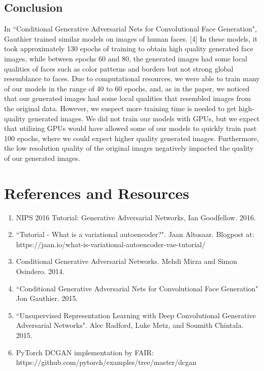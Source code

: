 \documentclass[a4paper]{article}
\begin{document}
\subsection*{Conclusion}
In ``Conditional Generative Adversarial Nets for Convolutional Face Generation", Gauthier trained similar models on images of human faces. [4] In these models, it took approximately 130 epochs of training to obtain high quality generated face images, while between epochs 60 and 80, the generated images had some local qualities of faces such as color patterns and borders but not strong global resemblance to faces. Due to computational resources, we were able to train many of our models in the range of 40 to 60 epochs, and, as in the paper, we noticed that our generated images had some local qualities that resembled images from the original data.
\newline
\newline
However, we suspect more training time is needed to get high-quality generated images. We did not train our models with GPUs, but we expect that utilizing GPUs would have allowed some of our models to quickly train past 100 epochs, where we could expect higher quality generated images. Furthermore, the low resolution quality of the original images negatively impacted the quality of our generated images.

\section*{References and Resources}
\begin{enumerate}
\item{NIPS 2016 Tutorial: Generative Adversarial Networks, Ian Goodfellow. 2016. }
\item{``Tutorial - What is a variational autoencoder?". Jaan Altosaar. Blogpost at: https://jaan.io/what-is-variational-autoencoder-vae-tutorial/}
\item{Conditional Generative Adversarial Networks. Mehdi Mirza and Simon Osindero. 2014. }
\item{``Conditional Generative Adversarial Nets for Convolutional Face Generation" Jon Gauthier. 2015. }
\item{``Unsupervised Representation Learning with Deep Convolutional Generative Adversarial Networks". Alec Radford, Luke Metz, and Soumith Chintala. 2015. }
\item{PyTorch DCGAN implementation by FAIR: https://github.com/pytorch/examples/tree/master/dcgan}
\end{enumerate}
\end{document}
